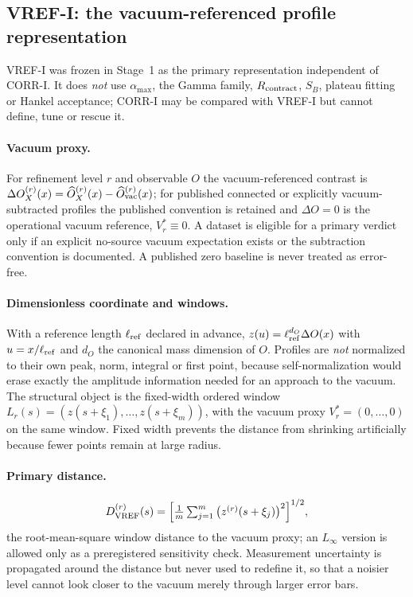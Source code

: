 \documentclass[11pt,a4paper]{article}
\theoremstyle{definition}
\theoremstyle{remark}
\begin{document}
\subsection{VREF-I: the vacuum-referenced profile representation}\label{ssec:vrefi}
VREF-I was frozen in Stage~1 as the primary representation independent of CORR-I. It does \emph{not} use $\alpha_{\max}$, the Gamma family, $R_{\rm contract}$, $S_B$, plateau fitting or Hankel acceptance; CORR-I may be compared with VREF-I but cannot define, tune or rescue it.

\paragraph{Vacuum proxy.} For refinement level $r$ and observable $O$ the vacuum-referenced contrast is $\Delta O_X^{(r)}(x)=\widehat O_X^{(r)}(x)-\widehat O_{\rm vac}^{(r)}(x)$; for published connected or explicitly vacuum-subtracted profiles the published convention is retained and $\Delta O=0$ is the operational vacuum reference, $V^*_r\equiv0$. A dataset is eligible for a primary verdict only if an explicit no-source vacuum expectation exists or the subtraction convention is documented. A published zero baseline is never treated as error-free.

\paragraph{Dimensionless coordinate and windows.} With a reference length $\ell_{\rm ref}$ declared in advance, $z(u)=\ell_{\rm ref}^{d_O}\Delta O(x)$ with $u=x/\ell_{\rm ref}$ and $d_O$ the canonical mass dimension of $O$. Profiles are \emph{not} normalized to their own peak, norm, integral or first point, because self-normalization would erase exactly the amplitude information needed for an approach to the vacuum. The structural object is the fixed-width ordered window $L_r(s)=(z(s+\xi_1),\dots,z(s+\xi_m))$, with the vacuum proxy $V^*_r=(0,\dots,0)$ on the same window. Fixed width prevents the distance from shrinking artificially because fewer points remain at large radius.

\paragraph{Primary distance.} 
\begin{equation}
D_{\rm VREF}^{(r)}(s)=\Big[\tfrac1m\textstyle\sum_{j=1}^m\big(z^{(r)}(s+\xi_j)\big)^2\Big]^{1/2},
\end{equation}
the root-mean-square window distance to the vacuum proxy; an $L_\infty$ version is allowed only as a preregistered sensitivity check. Measurement uncertainty is propagated around the distance but never used to redefine it, so that a noisier level cannot look closer to the vacuum merely through larger error bars.
\end{document}

